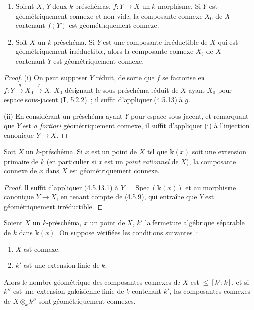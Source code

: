 \begin{corollary}[4.5.13.1]
\label{IV.2.4.5.13.1-fr}
\begin{enumerate}
\item[\textup{(i)}] Soient $X$, $Y$ deux $k$-préschémas, $f:Y\to X$ un $k$-morphisme.
Si $Y$ est géométriquement connexe et non vide, la composante connexe $X_0$ de
$X$ contenant $f(Y)$ est géométriquement connexe.
\item[\textup{(ii)}] Soit $X$ un $k$-préschéma. Si $Y$ est une composante irréductible
de $X$ qui est géométriquement irréductible, alors la composante connexe $X_0$
de $X$ contenant $Y$ est géométriquement connexe.
\end{enumerate}
\end{corollary}

\begin{proof}
(i) On peut supposer $Y$ réduit, de sorte que $f$ se factorise en
$f:Y\xrightarrow{g}X_0\xrightarrow{j}X$, $X_0$
désignant le sous-préschéma réduit de $X$ ayant $X_0$ pour espace sous-jacent
(\textbf{I}, 5.2.2)~; il suffit d'appliquer (4.5.13) à $g$.

(ii) En considérant un préschéma ayant $Y$ pour espace sous-jacent, et
remarquant que $Y$ est \emph{a fortiori} géométriquement connexe, il suffit
d'appliquer (i) à l'injection canonique $Y\to X$.
\end{proof}

\begin{corollary}[4.5.14]
\label{IV.2.4.5.14-fr}
Soit $X$ un $k$-préschéma. Si $x$ est un point de $X$ tel que $\boldsymbol{k}(x)$ soit une
extension primaire de $k$ \textup{(en particulier si $x$ est un \emph{point rationnel} de
$X$)}, la composante connexe de $x$ dans $X$ est géométriquement connexe.
\end{corollary}

\begin{proof}
Il suffit d'appliquer (4.5.13.1) à $Y=\operatorname{Spec}(\boldsymbol{k}(x))$ et au
morphisme canonique $Y\to X$, en tenant compte de (4.5.9), qui entraîne que
$Y$ est géométriquement irréductible.
\end{proof}

\begin{proposition}[4.5.15]
\label{IV.2.4.5.15-fr}
Soient $X$ un $k$-préschéma, $x$ un point de $X$, $k'$ la fermeture algébrique
séparable de $k$ dans $\boldsymbol{k}(x)$. On suppose vérifiées les conditions suivantes~:
\begin{enumerate}
\item[\textup{(i)}] $X$ est connexe.
\item[\textup{(ii)}] $k'$ est une extension finie de $k$.
\end{enumerate}
Alors le nombre géométrique des composantes connexes de $X$ est
$\leqslant[k':k]$, et si $k''$ est une extension galoisienne finie de $k$
contenant $k'$, les composantes connexes de $X\otimes_k k''$ sont
géométriquement connexes.
\end{proposition}

